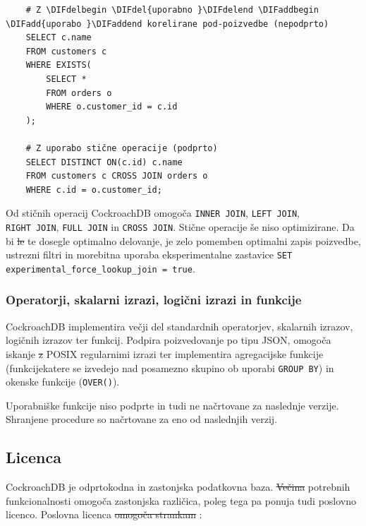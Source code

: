 \documentclass[a4paper, 12pt]{book}
\providecommand{\DIFaddtex}[1]{{\protect\color{blue}\uwave{#1}}} %
\providecommand{\DIFdeltex}[1]{{\protect\color{red}\sout{#1}}}                      %
\providecommand{\DIFaddbegin}{} %
\providecommand{\DIFaddend}{} %
\providecommand{\DIFdelbegin}{} %
\providecommand{\DIFdelend}{} %
\providecommand{\DIFadd}[1]{\texorpdfstring{\DIFaddtex{#1}}{#1}} %
\providecommand{\DIFdel}[1]{\texorpdfstring{\DIFdeltex{#1}}{}} %
\newcommand{\DIFscaledelfig}{0.5}
\newlength{\DIFdelgraphicswidth} %
\newlength{\DIFdelgraphicsheight} %
\newcommand{\DIFaddincludegraphics}[2][]{{\color{blue}\fbox{\DIFOincludegraphics[#1]{#2}}}} %
\newcommand{\DIFdelincludegraphics}[2][]{%
\sbox{\DIFdelgraphicsbox}{\DIFOincludegraphics[#1]{#2}}%
\settoboxwidth{\DIFdelgraphicswidth}{\DIFdelgraphicsbox} %
\settoboxtotalheight{\DIFdelgraphicsheight}{\DIFdelgraphicsbox} %
\scalebox{\DIFscaledelfig}{%
\parbox[b]{\DIFdelgraphicswidth}{\usebox{\DIFdelgraphicsbox}\\[-\baselineskip] \rule{\DIFdelgraphicswidth}{0em}}\llap{\resizebox{\DIFdelgraphicswidth}{\DIFdelgraphicsheight}{%
\setlength{\unitlength}{\DIFdelgraphicswidth}%
\begin{picture}(1,1)%
\thicklines\linethickness{2pt} %
{\color[rgb]{1,0,0}\put(0,0){\framebox(1,1){}}}%
{\color[rgb]{1,0,0}\put(0,0){\line( 1,1){1}}}%
{\color[rgb]{1,0,0}\put(0,1){\line(1,-1){1}}}%
\end{picture}%
}\hspace*{3pt}}} %
} %
\DeclareRobustCommand{\DIFaddbegin}{\DIFOaddbegin \let\includegraphics\DIFaddincludegraphics} %
\DeclareRobustCommand{\DIFaddend}{\DIFOaddend \let\includegraphics\DIFOincludegraphics} %
\DeclareRobustCommand{\DIFdelbegin}{\DIFOdelbegin \let\includegraphics\DIFdelincludegraphics} %
\DeclareRobustCommand{\DIFdelend}{\DIFOaddend \let\includegraphics\DIFOincludegraphics} %
\begin{document}
\begin{listing}[H]
\begin{verbatim}
    # Z \DIFdelbegin \DIFdel{uporabno }\DIFdelend \DIFaddbegin \DIFadd{uporabo }\DIFaddend korelirane pod-poizvedbe (nepodprto)
    SELECT c.name
    FROM customers c
    WHERE EXISTS(
        SELECT *
        FROM orders o
        WHERE o.customer_id = c.id
    );

    # Z uporabo stične operacije (podprto)
    SELECT DISTINCT ON(c.id) c.name
    FROM customers c CROSS JOIN orders o
    WHERE c.id = o.customer_id;
\end{verbatim}
\label{code-correlated-sub-queries}
\end{listing}

Od stičnih operacij CockroachDB omogoča \texttt{INNER JOIN}, \texttt{LEFT JOIN},\\\texttt{RIGHT JOIN}, \texttt{FULL JOIN} in \texttt{CROSS JOIN}. Stične operacije še niso optimizirane. Da bi \DIFdelbegin \DIFdel{le }\DIFdelend te dosegle optimalno delovanje, je zelo pomemben optimalni zapis poizvedbe, ustrezni filtri in morebitna uporaba eksperimentalne zastavice \texttt{SET experimental\_force\_lookup\_join = true}.

\subsubsection{Operatorji, skalarni izrazi, logični izrazi in funkcije}
CockroachDB implementira večji del standardnih operatorjev, skalarnih izrazov, logičnih izrazov ter funkcij. Podpira poizvedovanje po tipu JSON, omogoča iskanje \DIFdelbegin \DIFdel{z }\DIFdelend \DIFaddbegin \DIFadd{s }\DIFaddend POSIX regularnimi izrazi ter implementira agregacijske funkcije (funkcije\DIFaddbegin \DIFadd{, }\DIFaddend katere se izvedejo nad posamezno skupino ob uporabi \texttt{GROUP BY}) in okenske funkcije (\texttt{OVER()}).

Uporabniške funkcije niso podprte in tudi ne načrtovane za naslednje verzije. Shranjene procedure so načrtovane za eno od naslednjih verzij.

\subsection{Licenca}

CockroachDB je odprtokodna in zastonjska podatkovna baza. \DIFdelbegin \DIFdel{Večina }\DIFdelend \DIFaddbegin \DIFadd{Večino }\DIFaddend potrebnih funkcionalnosti omogoča zastonjska različica, poleg tega pa ponuja tudi poslovno licenco. Poslovna licenca \DIFdelbegin \DIFdel{omogoča strankam }\DIFdelend \DIFaddbegin \DIFadd{strankam omogoča}\DIFaddend :
\end{document}
